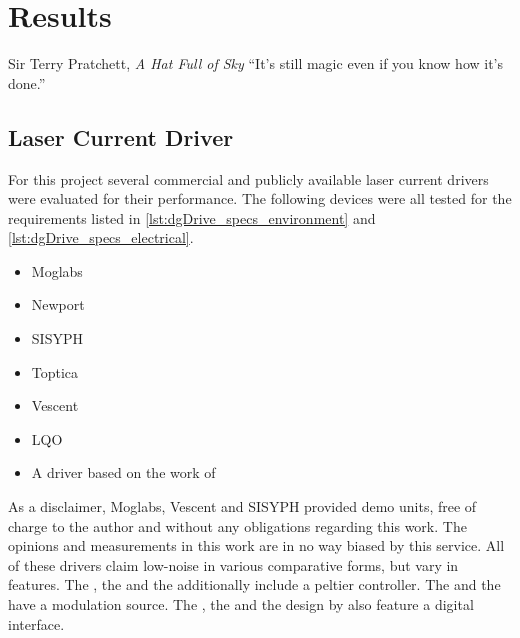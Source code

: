 \chapter{Results}
\label{sec:results}
\begin{chapquote}{Sir Terry Pratchett, \textit{A Hat Full of Sky}}
``It's still magic even if you know how it's done.''
\end{chapquote}

\section{Laser Current Driver}
For this project several commercial and publicly available laser current drivers were evaluated for their performance. The following devices were all tested for the requirements listed in \ref{lst:dgDrive_specs_environment} and \ref{lst:dgDrive_specs_electrical}.
\begin{itemize}
    \item Moglabs 
    \item Newport 
    \item SISYPH 
    \item Toptica 
    \item Vescent 
    \item LQO  \cite{datasheet_LQprO}
    \item A driver based on the work of \citeauthor{laser_driver_digital} \cite{laser_driver_digital}
\end{itemize}

As a disclaimer, Moglabs, Vescent and SISYPH provided demo units, free of charge to the author and without any obligations regarding this work. The opinions and measurements in this work are in no way biased by this service. All of these drivers claim low-noise in various comparative forms, but vary in features. The , the  and the  additionally include a peltier controller. The  and the  have a modulation source. The , the  and the design by \citeauthor{laser_driver_digital} also feature a digital interface.

